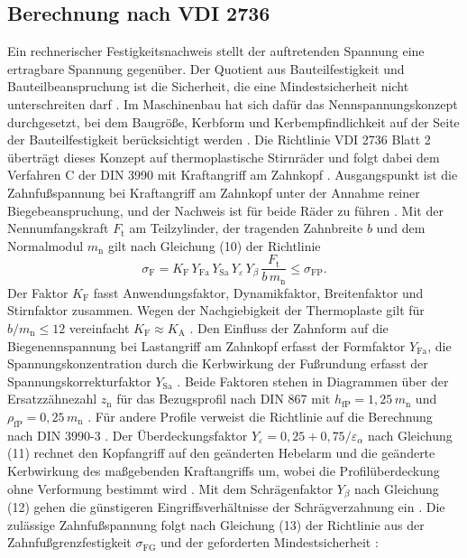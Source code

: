 \subsection{Berechnung nach VDI 2736}
\label{sec:vdi2736}

Ein rechnerischer Festigkeitsnachweis stellt der auftretenden Spannung eine ertragbare Spannung gegenüber. Der Quotient aus Bauteilfestigkeit und Bauteilbeanspruchung ist die Sicherheit, die eine Mindestsicherheit nicht unterschreiten darf \cite[S.~58]{Nie19}. Im Maschinenbau hat sich dafür das Nennspannungskonzept durchgesetzt, bei dem Baugröße, Kerbform und Kerbempfindlichkeit auf der Seite der Bauteilfestigkeit berücksichtigt werden \cite[S.~58]{Nie19}. Die Richtlinie VDI 2736 Blatt 2 überträgt dieses Konzept auf thermoplastische Stirnräder und folgt dabei dem Verfahren C der DIN 3990 mit Kraftangriff am Zahnkopf \cite[S.~36]{Has18}. Ausgangspunkt ist die Zahnfußspannung bei Kraftangriff am Zahnkopf unter der Annahme reiner Biegebeanspruchung, und der Nachweis ist für beide Räder zu führen \cite[S.~11]{VDI2736-2}. Mit der Nennumfangskraft $F_{\mathrm{t}}$ am Teilzylinder, der tragenden Zahnbreite $b$ und dem Normalmodul $m_{\mathrm{n}}$ gilt nach Gleichung (10) der Richtlinie \cite[S.~11]{VDI2736-2}
\begin{equation}
    \sigma_{\mathrm{F}} = K_{\mathrm{F}}\,Y_{\mathrm{Fa}}\,Y_{\mathrm{Sa}}\,Y_{\varepsilon}\,Y_{\beta}\,\frac{F_{\mathrm{t}}}{b\,m_{\mathrm{n}}} \leq \sigma_{\mathrm{FP}} .
    \label{eq:sigma_f_vdi}
\end{equation}
Der Faktor $K_{\mathrm{F}}$ fasst Anwendungsfaktor, Dynamikfaktor, Breitenfaktor und Stirnfaktor zusammen. Wegen der Nachgiebigkeit der Thermoplaste gilt für $b/m_{\mathrm{n}} \leq 12$ vereinfacht $K_{\mathrm{F}} \approx K_{\mathrm{A}}$ \cite[S.~11]{VDI2736-2}. Den Einfluss der Zahnform auf die Biegenennspannung bei Lastangriff am Zahnkopf erfasst der Formfaktor $Y_{\mathrm{Fa}}$, die Spannungskonzentration durch die Kerbwirkung der Fußrundung erfasst der Spannungskorrekturfaktor $Y_{\mathrm{Sa}}$ \cite[S.~11 bis 12]{VDI2736-2}. Beide Faktoren stehen in Diagrammen über der Ersatzzähnezahl $z_{\mathrm{n}}$ für das Bezugsprofil nach DIN 867 mit $h_{\mathrm{fP}} = 1{,}25\,m_{\mathrm{n}}$ und $\rho_{\mathrm{fP}} = 0{,}25\,m_{\mathrm{n}}$ \cite[S.~12 bis 13]{VDI2736-2}. Für andere Profile verweist die Richtlinie auf die Berechnung nach DIN 3990-3 \cite[S.~12 bis 13]{VDI2736-2}. Der Überdeckungsfaktor $Y_{\varepsilon} = 0{,}25 + 0{,}75/\varepsilon_{\alpha}$ nach Gleichung (11) rechnet den Kopfangriff auf den geänderten Hebelarm und die geänderte Kerbwirkung des maßgebenden Kraftangriffs um, wobei die Profilüberdeckung ohne Verformung bestimmt wird \cite[S.~13]{VDI2736-2}. Mit dem Schrägenfaktor $Y_{\beta}$ nach Gleichung (12) gehen die günstigeren Eingriffsverhältnisse der Schrägverzahnung ein \cite[S.~13]{VDI2736-2}. Die zulässige Zahnfußspannung folgt nach Gleichung (13) der Richtlinie aus der Zahnfußgrenzfestigkeit $\sigma_{\mathrm{FG}}$ und der geforderten Mindestsicherheit \cite[S.~13]{VDI2736-2}:

